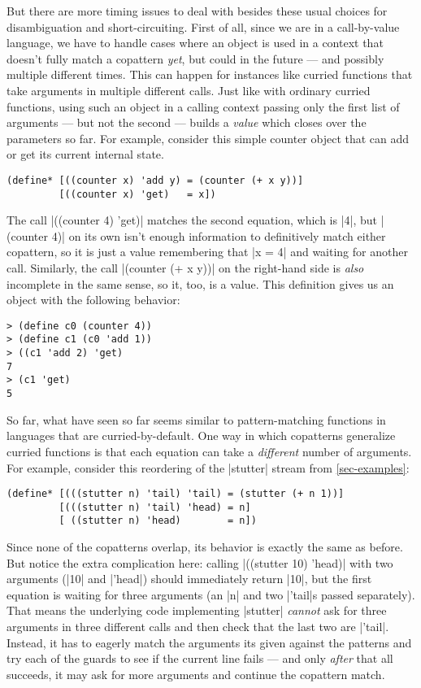 But there are more timing issues to deal with besides these usual choices for disambiguation and short-circuiting.
First of all, since we are in a call-by-value language, we have to handle cases where an object is used in a context that doesn't fully match a copattern \emph{yet}, but could in the future --- and possibly multiple different times.
This can happen for instances like curried functions that take arguments in multiple different calls.
Just like with ordinary curried functions, using such an object in a calling context passing only the first list of arguments --- but not the second --- builds a \emph{value} which closes over the parameters so far.
For example, consider this simple counter object that can add or get its current internal state.
\begin{verbatim}
(define* [((counter x) 'add y) = (counter (+ x y))]
         [((counter x) 'get)   = x])
\end{verbatim}
The call \scm|((counter 4) 'get)| matches the second equation, which is \scm|4|, but \scm|(counter 4)| on its own isn't enough information to definitively match either copattern, so it is just a value remembering that \scm|x = 4| and waiting for another call.
Similarly, the call \scm|(counter (+ x y))| on the right-hand side is \emph{also} incomplete in the same sense, so it, too, is a value.
This definition gives us an object with the following behavior:
\begin{verbatim}
> (define c0 (counter 4))
> (define c1 (c0 'add 1))
> ((c1 'add 2) 'get)
7
> (c1 'get)
5
\end{verbatim}

So far, what have seen so far seems similar to pattern-matching functions in languages that are curried-by-default.
One way in which copatterns generalize curried functions is that each equation can take a \emph{different} number of arguments.
For example, consider this reordering of the \scm|stutter| stream from \cref{sec-examples}:
\begin{verbatim}
(define* [(((stutter n) 'tail) 'tail) = (stutter (+ n 1))]
         [(((stutter n) 'tail) 'head) = n]
         [ ((stutter n) 'head)        = n])
\end{verbatim}
Since none of the copatterns overlap, its behavior is exactly the same as before.
But notice the extra complication here: calling \scm|((stutter 10) 'head)| with two arguments (\scm|10| and \scm|'head|) should immediately return \scm|10|, but the first equation is waiting for three arguments (an \scm|n| and two \scm|'tail|s passed separately).
That means the underlying code implementing \scm|stutter| \emph{cannot} ask for three arguments in three different calls and then check that the last two are \scm|'tail|.
Instead, it has to eagerly match the arguments its given against the patterns and try each of the guards to see if the current line fails --- and only \emph{after} that all succeeds, it may ask for more arguments and continue the copattern match.

